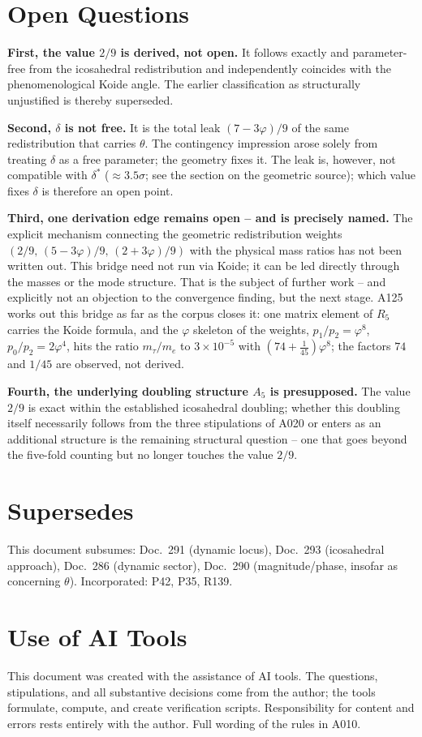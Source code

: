 \section{Open Questions}

\textbf{First, the value $2/9$ is derived, not open.} It follows exactly and
parameter-free from the icosahedral redistribution and independently coincides
with the phenomenological Koide angle. The earlier classification as structurally
unjustified is thereby superseded.

\textbf{Second, $\delta$ is not free.} It is the total leak $(7-3\varphi)/9$ of
the same redistribution that carries $\theta$. The contingency impression arose
solely from treating $\delta$ as a free parameter; the geometry fixes it. The leak is, however, not compatible with $\delta^*$ ($\approx3{.}5\sigma$; see the section on the geometric source); which value fixes $\delta$ is therefore an open point.

\textbf{Third, one derivation edge remains open -- and is precisely named.} The
explicit mechanism connecting the geometric redistribution weights
$(2/9,\,(5-3\varphi)/9,\,(2+3\varphi)/9)$ with the physical mass ratios has not
been written out. This bridge need not run via Koide; it can be led directly
through the masses or the mode structure. That is the subject of further work --
and explicitly not an objection to the convergence finding, but the next stage. A125 works out this bridge as far as the corpus closes it: one matrix element of $R_5$ carries the Koide formula, and the $\varphi$ skeleton of the weights, $p_1/p_2=\varphi^8$, $p_0/p_2=2\varphi^4$, hits the ratio $m_\tau/m_e$ to $3\times10^{-5}$ with $(74+\tfrac1{45})\varphi^8$; the factors $74$ and $1/45$ are observed, not derived.

\textbf{Fourth, the underlying doubling structure $A_5$ is presupposed.} The value
$2/9$ is exact within the established icosahedral doubling; whether this doubling
itself necessarily follows from the three stipulations of A020 or enters as an
additional structure is the remaining structural question -- one that goes beyond
the five-fold counting but no longer touches the value $2/9$.

\section{Supersedes}

This document subsumes: Doc.~291 (dynamic locus), Doc.~293 (icosahedral approach),
Doc.~286 (dynamic sector), Doc.~290 (magnitude/phase, insofar as concerning
$\theta$). Incorporated: P42, P35, R139.

\section{Use of AI Tools}

This document was created with the assistance of AI tools. The questions,
stipulations, and all substantive decisions come from the author; the tools
formulate, compute, and create verification scripts.
Responsibility for content and errors rests entirely with the author.
Full wording of the rules in A010.
